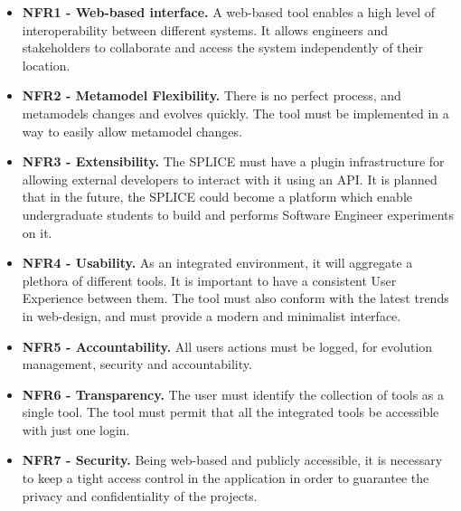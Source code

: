 \begin{itemize}
\item  \textbf{ NFR1 - Web-based interface. } A web-based tool enables a high level of interoperability between different systems. It allows engineers and stakeholders to collaborate and access the system independently of their location.

\item  \textbf{ NFR2 - Metamodel Flexibility. } There is no perfect process, and metamodels changes and evolves quickly. The tool must be implemented in a way to easily allow metamodel changes.


\item  \textbf{ NFR3 - Extensibility. } The \ac{SPLICE} must have a plugin infrastructure for allowing external developers to interact with it using an API. It is planned that in the future, the \ac{SPLICE} could become a platform which enable undergraduate students to build and performs Software Engineer experiments on it.

\item  \textbf{ NFR4 - Usability. } As an integrated environment, it will aggregate a plethora of different tools. It is important to have a consistent User Experience between them. The tool must also conform with the latest trends in web-design, and must provide a modern and minimalist interface.

\item  \textbf{ NFR5 - Accountability. } All users actions must be logged, for evolution management, security and accountability. 

\item  \textbf{ NFR6 - Transparency. } The user must identify the collection of tools as a single tool. The tool must permit that all the integrated tools be accessible with just one login.

\item  \textbf{ NFR7 - Security. } Being web-based and publicly accessible, it is necessary to keep a tight access control in the application in order to guarantee the privacy and confidentiality of the projects.


\end{itemize}


